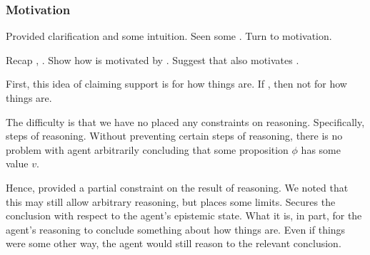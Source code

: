 \subsubsection{Motivation}
\label{sec:motivation}

\begin{note}
  Provided clarification and some intuition.
  Seen some .
  Turn to motivation.

  Recap \ideaS{}, \support{}.
  Show how \ideaCS{} is motivated by \ideaS{}.
  Suggest that \ideaCS{} also motivates \ideaS{}.
\end{note}

\begin{note}
  First, this idea of claiming support is for how things are.
  If \epVW{}, then not for how things are.

  The difficulty is that we have no placed any constraints on reasoning.
  Specifically, steps of reasoning.
  Without preventing certain steps of reasoning, there is no problem with agent arbitrarily concluding that some proposition \(\phi\) has some value \(v\).

  Hence, \ideaS{} provided a partial constraint on the result of reasoning.
  We noted that this may still allow arbitrary reasoning, but \ideaS{} places some limits.
  Secures the conclusion with respect to the agent's epistemic state.
  What it is, in part, for the agent's reasoning to conclude something about how things are.
  Even if things were some other way, the agent would still reason to the relevant conclusion.
\end{note}

